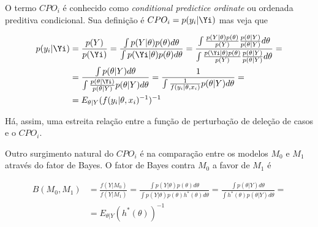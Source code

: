 O termo $CPO_i$ é conhecido como \textit{conditional predictice ordinate} ou ordenada preditiva condicional. Sua definição é $CPO_i=p(y_i|\Yi)$ mas veja que

\begin{equation*}
\begin{split}
p(y_i|\Yi) & = \frac{p(Y)}{p(\Yi)} = \frac{\int p(Y|\theta) p(\theta) d\theta}{\int p(\Yi|\theta) p(\theta) d\theta} = \frac{\int \frac{p(Y|\theta) p(\theta)}{p(Y)} \frac{p(\theta|Y)}{p(\theta|Y)} d\theta}{\int \frac{p(\Yi|\theta) p(\theta)}{p(Y)} \frac{p(\theta|Y)}{p(\theta|Y)} d\theta} =\\
{}& = \frac{\int p(\theta|Y) d\theta}{\int \frac{p(\theta|\Yi)}{p(\theta|Y)} p(\theta|Y) d\theta} = \frac{1}{\int \frac{1}{f(y_i|\theta,x_i)} p(\theta|Y) d\theta} = \\
{} & = E_{\theta|Y}(f(y_i|\theta,x_i)^{-1})^{-1}
\end{split}
\end{equation*}

Há, assim, uma estreita relação entre a função de perturbação de deleção de casos e o $CPO_i$. 

Outro surgimento natural do $CPO_i$ é na comparação entre os modelos $M_0$ e $M_1$ através do fator de Bayes. O fator de Bayes contra $M_0$ a favor de $M_1$ é

\begin{equation*}
\begin{split}
B(M_0,M_1)&=\frac{f(Y|M_0)}{f(Y|M_1)}=\frac{\int p(Y|\theta)p(\theta) d\theta}{\int p(Y|\theta)p(\theta)h^*(\theta) d\theta}=\frac{\int p(\theta|Y) d\theta}{\int h^*(\theta)p(\theta|Y) d\theta}=\\
{}&= E_{\theta|Y}(h^*(\theta))^{-1}
\end{split}
\end{equation*}